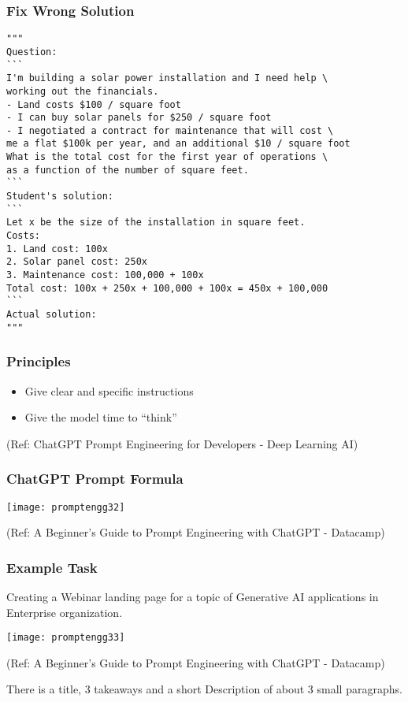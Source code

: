 \begin{frame}[fragile]\frametitle{Fix Wrong Solution}


{\tiny
\begin{lstlisting}
"""
Question:
```
I'm building a solar power installation and I need help \
working out the financials. 
- Land costs $100 / square foot
- I can buy solar panels for $250 / square foot
- I negotiated a contract for maintenance that will cost \
me a flat $100k per year, and an additional $10 / square foot
What is the total cost for the first year of operations \
as a function of the number of square feet.
``` 
Student's solution:
```
Let x be the size of the installation in square feet.
Costs:
1. Land cost: 100x
2. Solar panel cost: 250x
3. Maintenance cost: 100,000 + 100x
Total cost: 100x + 250x + 100,000 + 100x = 450x + 100,000
```
Actual solution:
"""
\end{lstlisting}
}
\end{frame}


\begin{frame}[fragile]\frametitle{Principles}

\begin{itemize}
\item Give clear and specific instructions
\item Give the model time to “think”
\end{itemize}
		
{\tiny (Ref: ChatGPT Prompt Engineering for Developers - Deep Learning AI)}
		
\end{frame}


\begin{frame}[fragile]\frametitle{ChatGPT Prompt Formula}

\begin{center}
\texttt{[image: promptengg32]}

{\tiny (Ref: A Beginner's Guide to Prompt Engineering with ChatGPT - Datacamp)}

\end{center}		
		

\end{frame}

\begin{frame}[fragile]\frametitle{Example Task}

Creating a Webinar landing page for a topic of Generative AI applications in Enterprise organization.

\begin{center}
\texttt{[image: promptengg33]}

{\tiny (Ref: A Beginner's Guide to Prompt Engineering with ChatGPT - Datacamp)}

\end{center}		
		
There is a title, 3 takeaways and a short Description of about 3 small paragraphs.

\end{frame}

